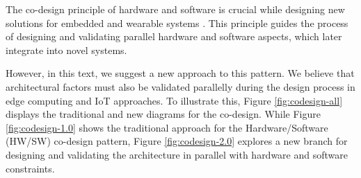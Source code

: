 The co-design principle of hardware and software is crucial while designing new solutions for embedded and wearable systems \cite{demicheli2013hardware,de1997hardware}. This principle guides the process of designing and validating parallel hardware and software aspects, which later integrate into novel systems.
 
However, in this text, we suggest a new approach to this pattern. We believe that architectural factors must also be validated parallelly during the design process in edge computing and IoT approaches. To illustrate this, Figure \ref{fig:codesign-all} displays the traditional and new diagrams for the co-design. While Figure \ref{fig:codesign-1.0} shows the traditional approach for the Hardware/Software (HW/SW) co-design pattern, Figure \ref{fig:codesign-2.0} explores a new branch for designing and validating the architecture in parallel with hardware and software constraints.
 
